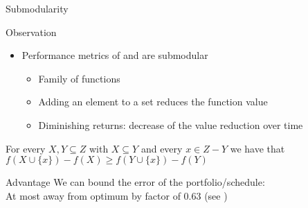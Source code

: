 \begin{frame}[c]{Submodularity}

\begin{block}{Observation}
\begin{itemize}
  \item Performance metrics of \hydra{} and \cedalion{} are submodular
  \begin{itemize}
    \item Family of functions
    \item Adding an element to a set reduces the function value
    \item Diminishing returns: decrease of the value reduction over time
  \end{itemize}
\end{itemize}
\end{block}

\pause

\begin{definition}[Submodularity of $f$]
For every $X,Y \subseteq Z$ with $X \subseteq Y$ and every $x \in Z - Y$ we have that $f(X \cup \{x\}) - f(X) \geq f(Y \cup \{x\}) - f(Y)$
\end{definition}

\pause

\begin{block}{Advantage}
We can bound the error of the portfolio/schedule:\\ 
At most away from optimum by factor of $0.63$ (see )
\end{block}

\end{frame}
